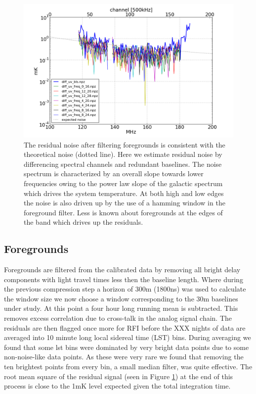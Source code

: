 \documentclass[preprint]{aastex}
\begin{document}
\begin{figure}
\centering
\includegraphics[width=\textwidth]{figures/trms_by_baseline.png}
\caption{\label{fig:noise} The residual noise after filtering foregrounds is consistent with the theoretical noise (dotted line).  Here we estimate residual noise by differencing spectral channels and redundant baselines. The noise spectrum is characterized by an overall slope towards lower frequencies owing to the power law slope of the galactic spectrum which drives the system temperature.  At both high and low edges the noise is also driven up by the use of a hamming window in the foreground filter. Less is known about foregrounds at the edges of the band which drives up the residuals.}
\end{figure}
\subsection{Foregrounds}
Foregrounds are filtered from the calibrated data by removing all bright delay components with light travel times less then the baseline length. Where during the previous compression step a  horizon of 300m (1800ns)  was used to calculate the window size we now choose a window corresponding to the 30m baselines under study.  At this point a four hour long running mean is subtracted. This removes excess correlation due to cross-talk in the analog signal chain. The residuals are then flagged once more for RFI before the XXX nights of data are averaged into 10 minute long local sidereal time (LST) bins.  During averaging we found that some lst bins were dominated by very bright data points due to some non-noise-like data points. As these were very rare we found that removing the ten brightest points from every bin, a small median filter, was quite effective.   The root mean square of the residual signal (seen in Figure \ref{fig:noise}) at the end of this process is close to the 1mK level expected given the total integration time.
\end{document}
